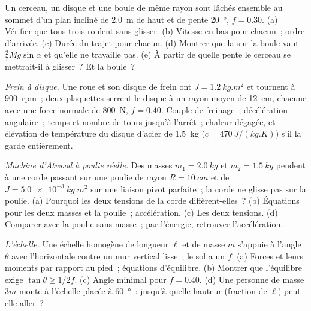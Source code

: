 \begin{exercise}[$\star\star$]\label{exo:b2:rigid-body-mechanics:5}
Un cerceau, un disque et une boule de même rayon sont lâchés ensemble
au sommet d'un plan incliné de \qty{2.0}{m} de haut et de pente \qty{20}{\degree}, $f =
0.30$. (a) Vérifier que tous trois roulent sans glisser. (b) Vitesse en
bas pour chacun~; ordre d'arrivée. (c) Durée du trajet pour chacun. (d) Montrer que
la  sur la boule vaut $\tfrac27Mg\sin\alpha$ et qu'elle ne
travaille pas. (e) À partir de quelle pente le cerceau se mettrait-il à glisser~? Et la boule~?
\end{exercise}

\begin{exercise}[$\star\star$]\label{exo:b2:rigid-body-mechanics:6}
\emph{Frein à disque.} Une roue et son disque de frein ont $J = \qty{1.2}{kg.m^2}$
et tournent à \qty{900}{rpm}~; deux plaquettes serrent le disque à un rayon moyen
de \qty{12}{cm}, chacune avec une force normale de \qty{800}{N}, $f = 0.40$.
Couple de freinage~; décélération angulaire~; temps et nombre de tours jusqu'à l'arrêt~;
chaleur dégagée, et élévation de température du disque d'acier de \qty{1.5}{kg}
($c = \qty{470}{J/(kg.K)}$) s'il la garde entièrement.
\end{exercise}

\begin{exercise}[$\star\star$]\label{exo:b2:rigid-body-mechanics:7}
\emph{Machine d'Atwood à poulie réelle.} Des masses $m_1 = \qty{2.0}{kg}$
et $m_2 = \qty{1.5}{kg}$ pendent à une corde passant sur une poulie de rayon $R =
\qty{10}{cm}$ et de  $J = \qty{5.0e-3}{kg.m^2}$ sur une
liaison pivot parfaite~; la corde ne glisse pas sur la poulie. (a) Pourquoi les deux
tensions de la corde diffèrent-elles~? (b) Équations pour les deux masses et la
poulie~; accélération. (c) Les deux tensions. (d) Comparer avec la
poulie sans masse~; par l'énergie, retrouver l'accélération.
\end{exercise}

\begin{exercise}[$\star\star$]\label{exo:b2:rigid-body-mechanics:8}
\emph{L'échelle.} Une échelle homogène de longueur $\ell$ et de masse $m$ s'appuie
à l'angle $\theta$ avec l'horizontale contre un mur vertical lisse~;
le sol a un  $f$. (a) Forces et leurs moments
par rapport au pied~; équations d'équilibre. (b) Montrer que l'équilibre exige
$\tan\theta \ge 1/2f$. (c) Angle minimal pour $f = 0.40$. (d) Une personne de
masse $3m$ monte à l'échelle placée à \qty{60}{\degree}~: jusqu'à quelle hauteur (fraction
de $\ell$) peut-elle aller~?
\end{exercise}

